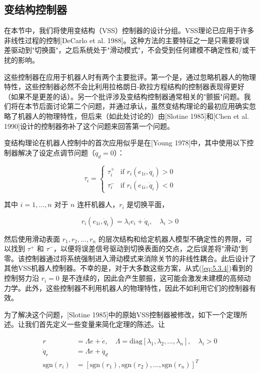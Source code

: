 \documentclass[UTF8,12pt,a4paper]{ctexart}
\begin{document}
\subsection{变结构控制器}

在本节中，我们将使用变结构（VSS）控制器的设计分组。VSS理论已应用于许多非线性过程的控制[DeCarlo et al. 1988]。这种方法的主要特征之一是只需要将误差驱动到"切换面"，之后系统处于"滑动模式"，不会受到任何建模不确定性和/或干扰的影响。

这些控制器在应用于机器人时有两个主要批评。第一个是，通过忽略机器人的物理特性，这些控制器必然不会比利用拉格朗日-欧拉方程结构的控制器表现得更好（如果不是更差的话）。另一个批评涉及变结构控制器通常相关的"颤振"问题。我们将在本节后面讨论第二个问题，并通过承认，虽然变结构理论的最初应用确实忽略了机器人的物理特性，但后来（如此处讨论的）由[Slotine 1985]和[Chen et al. 1990]设计的控制器弥补了这个问题来回答第一个问题。

变结构理论在机器人控制中的首次应用似乎是在[Young 1978]中，其中使用以下控制器解决了设定点调节问题（$\dot{q}_d = 0$）：

\begin{equation}\label{eq:5.3.4}
\tau_i = \begin{cases}
\tau_i^+ & \text{if } r_i(e_{1i}, \dot{q}_i) > 0 \\
\tau_i^- & \text{if } r_i(e_{1i}, \dot{q}_i) < 0
\end{cases}
\end{equation}

其中 $i = 1, \ldots, n$ 对于 $n$ 连杆机器人，$r_i$ 是切换平面，

\begin{equation}\label{eq:5.3.5}
r_i(e_{1i}, \dot{q}_i) = \lambda_i e_i + \dot{q}_i, \quad \lambda_i > 0
\end{equation}

然后使用滑动表面 $r_1, r_2, \ldots, r_n$ 的层次结构和给定机器人模型不确定性的界限，可以找到 $\tau^+$ 和 $\tau^-$，以便将误差信号驱动到切换表面的交点，之后误差将"滑动"到零。该控制器通过将系统强制进入滑动模式来消除关节的非线性耦合。此后设计了其他VSS机器人控制器。不幸的是，对于大多数这些方案，从式(\ref{eq:5.3.4})看到的控制努力沿 $r_i = 0$ 是不连续的，因此会产生颤振，这可能会激发未建模的高频动力学。此外，这些控制器不利用机器人的物理特性，因此不如利用它们的控制器有效。

为了解决这个问题，[Slotine 1985]中的原始VSS控制器被修改，如下一个定理所述。让我们首先定义一些变量来简化定理的陈述。让

\begin{equation}\label{eq:5.3.6}
\begin{aligned}
r &= \Lambda e + \dot{e}, \quad \Lambda = \text{diag}[\lambda_1, \lambda_2, \ldots, \lambda_n], \quad \lambda_i > 0 \\
\dot{q}_r &= \Lambda e + \dot{q}_d \\
\text{sgn}(r_i) &= [\text{sgn}(r_1), \text{sgn}(r_2), \ldots, \text{sgn}(r_n)]^T
\end{aligned}
\end{equation}
\end{document}
